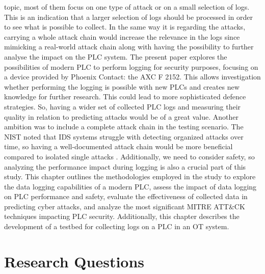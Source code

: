 \documentclass[Master,BMR,english]{twbook}
\begin{document}
topic, most of them focus on one type of attack or on a small selection of logs. This is an indication that a larger selection of logs should be processed in order to see what is possible to collect. In the same way it is regarding the attacks, carrying a whole attack chain would increase the relevance in the logs since mimicking a real-world attack chain along with having the possibility to further analyse the impact on the PLC system. The present paper explores the possibilities of modern PLC to perform logging for security purposes, focusing on a device provided by Phoenix Contact: the AXC F 2152. This allows investigation whether performing the logging is possible with new PLCs and creates new knowledge for further research. This could lead to more sophisticated defence strategies. So, having a wider set of collected PLC logs and measuring their quality in relation to predicting attacks would be of a great value. Another ambition was to include a complete attack chain in the testing scenario. The NIST noted that IDS systems struggle with detecting organized attacks over time, so having a well-documented attack chain would be more beneficial compared to isolated single attacks \cite{stouffer_guide_2015}. Additionally, we need to consider safety, so analyzing the performance impact during logging is also a crucial part of this study. This chapter outlines the methodologies employed in the study to explore the data logging capabilities of a modern PLC, assess the impact of data logging on PLC performance and safety, evaluate the effectiveness of collected data in predicting cyber attacks, and analyze the most significant MITRE ATT\&CK techniques impacting PLC security. Additionally, this chapter describes the development of a testbed for collecting logs on a PLC in an OT system\cite{mitre_attack_ics}.

\section{Research Questions}
\end{document}
